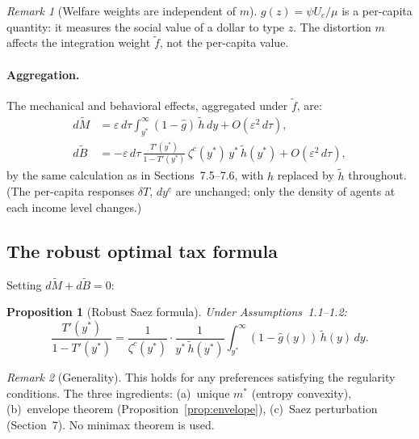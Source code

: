 \documentclass[12pt,a4paper]{article}
\theoremstyle{definition}
\theoremstyle{plain}
\newtheorem{proposition}{Proposition}[section]
\theoremstyle{remark}
\newtheorem{remark}{Remark}[section]
\begin{document}
\begin{remark}[Welfare weights are independent of $m$]
\label{rem:weights}
$g(z) = \psi U_c/\mu$ is a per-capita quantity: it measures
the social value of a dollar to type $z$.  The distortion
$m$ affects the integration weight $\widetilde{f}$, not the
per-capita value.
\end{remark}

\paragraph{Aggregation.}
The mechanical and behavioral effects, aggregated under
$\widetilde{f}$, are:
\begin{align}
  d\widetilde{M}
  &= \varepsilon\,d\tau
  \int_{y^*}^\infty (1 - \hat{g})\,\widetilde{h}\,dy
  + O(\varepsilon^2\,d\tau),
  \label{eq:dM_agg} \\
  d\widetilde{B}
  &= -\varepsilon\,d\tau\,
  \frac{T'(y^*)}{1-T'(y^*)}\,\zeta^c(y^*)\,y^*\,
  \widetilde{h}(y^*)
  + O(\varepsilon^2\,d\tau),
  \label{eq:dB_agg}
\end{align}
by the same calculation as in Sections~7.5--7.6, with
$h$ replaced by $\widetilde{h}$ throughout.  (The
per-capita responses $\delta T$, $dy^c$ are unchanged;
only the density of agents at each income level changes.)


\subsection{The robust optimal tax formula}
\label{sec:robust_formula}

Setting $d\widetilde{M} + d\widetilde{B} = 0$:

\begin{proposition}[Robust Saez formula]
\label{prop:robust_saez}
Under Assumptions~1.1--1.2:
\begin{equation}
\label{eq:robust_saez}
  \boxed{
  \frac{T'(y^*)}{1 - T'(y^*)}
  = \frac{1}{\zeta^c(y^*)}
  \cdot \frac{1}{y^*\,\widetilde{h}(y^*)}
  \int_{y^*}^\infty
  (1 - \hat{g}(y))\,\widetilde{h}(y)\,dy.
  }
\end{equation}
\end{proposition}

\begin{remark}[Generality]
This holds for any preferences satisfying the regularity
conditions.  The three ingredients:
(a)~unique $m^*$ (entropy convexity),
(b)~envelope theorem (Proposition~\ref{prop:envelope}),
(c)~Saez perturbation (Section~7).
No minimax theorem is used.
\end{remark}
\end{document}
